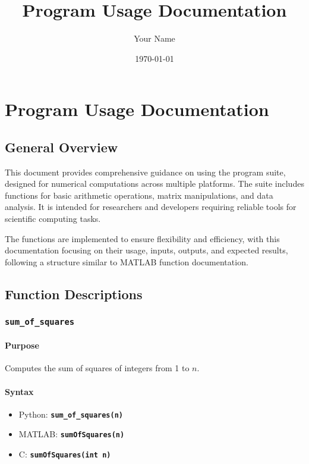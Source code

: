\documentclass[11pt, a4paper]{article}
\title{Program Usage Documentation}
\author{Your Name}
\date{\today}
\newcommand{\function}[1]{\texttt{\color{blue}\textbf{#1}}}
\begin{document}
	
	\maketitle
	
	\section*{Program Usage Documentation}
	
	\subsection*{General Overview}
	This document provides comprehensive guidance on using the program suite, designed for numerical computations across multiple platforms. The suite includes functions for basic arithmetic operations, matrix manipulations, and data analysis. It is intended for researchers and developers requiring reliable tools for scientific computing tasks.
	
	The functions are implemented to ensure flexibility and efficiency, with this documentation focusing on their usage, inputs, outputs, and expected results, following a structure similar to MATLAB function documentation.
	
	\subsection*{Function Descriptions}
	
	\subsubsection*{\function{sum\_of\_squares}}
	\paragraph*{Purpose}
	Computes the sum of squares of integers from 1 to $n$.
	
	\paragraph*{Syntax}
	\begin{itemize}
		\item Python: \function{sum\_of\_squares(n)}
		\item MATLAB: \function{sumOfSquares(n)}
		\item C: \function{sumOfSquares(int n)}
	\end{itemize}
	
\end{document}
